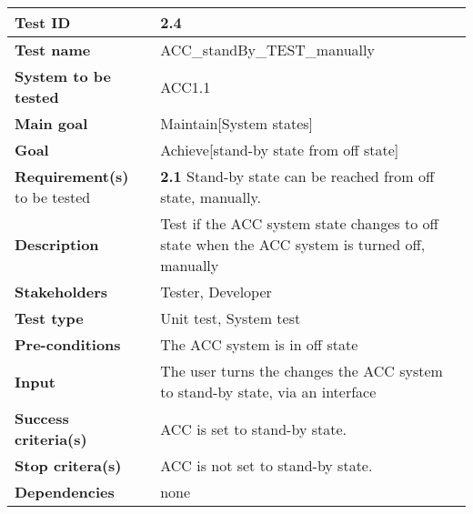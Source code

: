 	\begin{table}[H]
		\begin{tabular}{| p{4cm} | p{10cm} |}
			\hline
			\rowcolor{gray}
			{\bf Test ID} & 2.4 \\ \hline
			{\bf Test name} & ACC\_standBy\_TEST\_manually \\ \hline
			{\bf System to be tested} & ACC1.1\\ \hline
			{\bf Main goal} & Maintain[System states] \\ \hline
			{\bf Goal} & Achieve[stand-by state from off state]\\ \hline
			{\bf Requirement(s)} to be tested & {\bf 2.1} Stand-by state can be reached 
			from off state, manually.\\ \hline
			{\bf Description} & Test if the ACC system state changes to off state when 
			the ACC system is turned off, manually\\ \hline
			{\bf Stakeholders} & Tester, Developer \\ \hline
			{\bf Test type} & Unit test, System test \\ \hline
			{\bf Pre-conditions} & The ACC system is in off state \\ \hline
			{\bf Input} & The user turns the changes the ACC system to stand-by state, 
			via an interface \\ \hline
			{\bf Success criteria(s)} & ACC is set to stand-by state. \\ \hline
			{\bf Stop critera(s)} & ACC is not set to stand-by state.\\ \hline
			{\bf Dependencies} & none \\ \hline
		\end{tabular}
	\end{table}

